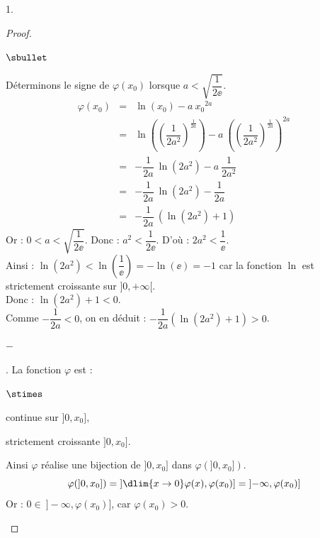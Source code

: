 \documentclass[11pt]{article}%
\begin{document}
\begin{noliste}{1.}
  \begin{proof}~
    \begin{noliste}{$\sbullet$}
    \item Déterminons le signe de $\varphi(x_0)$ lorsque 
      $a<\sqrt{\dfrac{1}{2\ee}}$.
      \[
      \begin{array}{rcl}
        \varphi(x_0) & = & \ln(x_0) - a \ x_0{}^{2a}
        \\[.2cm]
        & = &  
        \ln\left(\left(\dfrac{1}{2a^2}\right)^{\frac{1}{2a}}\right)
        - a \ \left(\left(\dfrac{1}{2a^2}\right)^{\frac{1}{2a}}
        \right)^{2a} 
        \\[.6cm]
        & = & -\dfrac{1}{2a} \ \ln(2a^2) - a \ \dfrac{1}{2a^2}
        \\[0.4cm]
        & = &  -\dfrac{1}{2a} \ \ln(2a^2) - \dfrac{1}{2a}
        \\[0.4cm]
        & = &  -\dfrac{1}{2a} \ (\ln(2a^2)+1)
      \end{array}
      \]
      Or : $0<a<\sqrt{\dfrac{1}{2\ee}}$. Donc : $a^2<\dfrac{1}{2\ee}$.
      D'où : $2a^2 <\dfrac{1}{\ee}$.\\[.1cm]
      Ainsi : $\ln(2a^2)<\ln\left(\dfrac{1}{\ee}\right)=-\ln(\ee)=-1$ car la 
      fonction $\ln$ est strictement croissante sur $]0,+\infty[$.\\[.1cm]
      Donc : $\ln(2a^2)+1<0$. \\[.1cm]
      Comme $-\dfrac{1}{2a}<0$, on en déduit : 
      $-\dfrac{1}{2a}(\ln(2a^2)+1)>0$. %
      

      
      
      \begin{noliste}{$-$}
      \item \dashuline{Étude sur $]0,x_0]$}. La fonction $\varphi$ est
        :
	\begin{noliste}{$\stimes$}
	\item continue sur $]0,x_0]$,
	\item strictement croissante $]0,x_0]$.
	\end{noliste}
        Ainsi $\varphi$ réalise une bijection de $]0,x_0]$ dans
        $\varphi(]0,x_0])$.
        \[
        \varphi(]0,x_0])= \left] \dlim{x \to 0}
          \varphi(x),\varphi(x_0)\right]= \left]-\infty,
          \varphi(x_0)\right]
        \]
        Or : $0\in \ ]-\infty, \varphi(x_0)]$, car $\varphi(x_0)>0$.%
        \conc{Donc l'équation $\varphi(x)=0$ admet exactement une
          solution sur $]0,x_0]$ \\ que l'on notera $z_1$.}
        

\end{noliste}
\end{noliste}
\end{proof}
\end{noliste}
\end{document}
